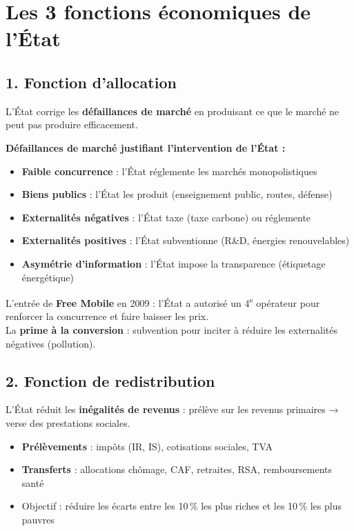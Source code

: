 \documentclass[11pt,a4paper]{article}
\begin{document}
\section*{Les 3 fonctions économiques de l'État}

\subsection*{1. Fonction d'allocation}
\begin{keybox}
L'État corrige les \textbf{défaillances de marché} en produisant ce que le marché ne peut pas produire efficacement.
\end{keybox}

\textbf{Défaillances de marché justifiant l'intervention de l'État :}
\begin{itemize}
  \item \textbf{Faible concurrence} : l'État réglemente les marchés monopolistiques
  \item \textbf{Biens publics} : l'État les produit (enseignement public, routes, défense)
  \item \textbf{Externalités négatives} : l'État taxe (taxe carbone) ou réglemente
  \item \textbf{Externalités positives} : l'État subventionne (R\&D, énergies renouvelables)
  \item \textbf{Asymétrie d'information} : l'État impose la transparence (étiquetage énergétique)
\end{itemize}

\begin{exbox}
L'entrée de \textbf{Free Mobile} en 2009 : l'État a autorisé un 4\textsuperscript{e} opérateur pour renforcer la concurrence et faire baisser les prix.\\
La \textbf{prime à la conversion} : subvention pour inciter à réduire les externalités négatives (pollution).
\end{exbox}

\subsection*{2. Fonction de redistribution}
\begin{keybox}
L'État réduit les \textbf{inégalités de revenus} : prélève sur les revenus primaires → verse des prestations sociales.
\end{keybox}
\begin{itemize}
  \item \textbf{Prélèvements} : impôts (IR, IS), cotisations sociales, TVA
  \item \textbf{Transferts} : allocations chômage, CAF, retraites, RSA, remboursements santé
  \item Objectif : réduire les écarts entre les 10\,\% les plus riches et les 10\,\% les plus pauvres
\end{itemize}
\end{document}

